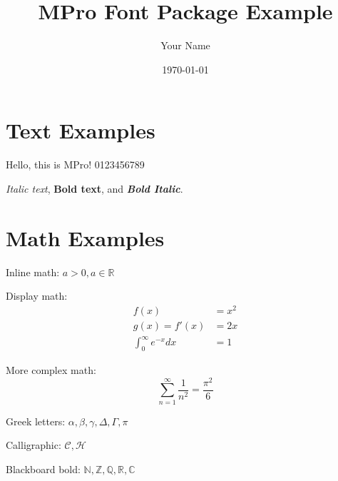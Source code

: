 \documentclass{article}
\title{MPro Font Package Example}
\author{Your Name}
\date{\today}
\begin{document}
\maketitle

\section{Text Examples}

Hello, this is MPro! 0123456789

\textit{Italic text}, \textbf{Bold text}, and \textbf{\textit{Bold Italic}}.

\section{Math Examples}

Inline math: $a > 0, a \in \mathbb{R}$

Display math:
\begin{align}
f(x) &= x^2 \\
g(x) = f'(x) &= 2x \\
\int_0^{\infty} e^{-x} dx &= 1
\end{align}

More complex math:
$$\sum_{n=1}^{\infty} \frac{1}{n^2} = \frac{\pi^2}{6}$$

Greek letters: $\alpha, \beta, \gamma, \Delta, \Gamma, \pi$

Calligraphic: $\mathcal{C}, \mathcal{H}$

Blackboard bold: $\mathbb{N}, \mathbb{Z}, \mathbb{Q}, \mathbb{R}, \mathbb{C}$
\end{document}
